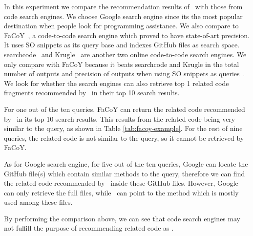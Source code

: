 In this experiment we compare the recommendation results of \tool\ with those from code search engines. We choose Google search engine since its the most popular destination when people look for programming assistance. We also compare to {\ttt FaCoY}~\cite{kim2018Facoy}, a code-to-code search engine which proved to have state-of-art precision. It uses SO snippets as its query base and indexes GitHub files as search space. {\ttt searchcode}~\cite{searchcode} and {\ttt Krugle}~\cite{krugle} are another two online code-to-code search engines. We only compare with {\ttt FaCoY} because it beats {\ttt searchcode} and {\ttt Krugle} in the total number of outputs and precision of outputs when using SO snippets as queries~\cite{kim2018Facoy}. 
We look for whether the search engines can also retrieve top 1 related code fragments recommended by \tool\ in their top 10 search results. 

For one out of the ten queries, {\ttt FaCoY} can return the related code recommended by \tool\ in its top 10 search results. This results from the related code being very similar to the query, as shown in Table \ref{tab:facoy-example}. For the rest of nine queries, the related code is not similar to the query, so it cannot be retrieved by {\ttt FaCoY}.

As for Google search engine, for five out of the ten queries, Google can locate the GitHub file(s) which contain similar methods to the query, therefore we can find the related code recommended by \tool\ inside these GitHub files. However, Google can only retrieve the full files, while \tool\ can point to the method which is mostly used among these files. 

By performing the comparison above, we can see that code search engines may not fulfill the purpose of recommending related code as \tool{}.
